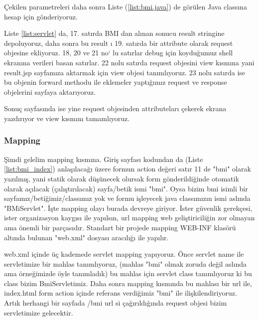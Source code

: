 
Çekilen parametreleri daha sonra Liste (\ref{list:bmi.java}) de görülen Java classına hesap için gönderiyoruz. 



Liste \ref{list:servlet} da, 17. satırda BMI dan alınan sonucu result stringine depoluyoruz, daha sonra bu result ı 19. satırda bir attribute olarak request objesine ekliyoruz. 18, 20 ve 21 no` lu satırlar debug için koyduğumuz shell ekranına verileri basan satırlar. 22 nolu satırda request objesini view kısmına yani result.jsp sayfamıza aktarmak için view objesi tanımlıyoruz. 23 nolu satırda ise bu objenin forward methodu ile eklemeler yaptığımız request ve response objelerini sayfaya aktarıyoruz.

Sonuç sayfasında ise yine request objesinden attributeları çekerek ekrana yazdırıyor ve view kısmını tamamlıyoruz.
\subsubsection{Mapping}

Şimdi gelelim mapping kısmına. Giriş sayfası  kodundan da (Liste \ref{list:bmi_index}) anlaşılacağı üzere formun action değeri satır 11 de  "bmi" olarak yazılmış, yani statik olarak düşünecek olursak form gönderildiğinde otomatik olarak açılacak (çalıştırılacak) sayfa/betik ismi "bmi". Oysa bizim bmi isimli bir sayfamız/betiğimiz/classımız yok ve formu işleyecek java classımızın ismi aslında "BMiServlet". İşte mapping olayı burada devreye giriyor. İster güvenlik gerekçesi, ister organizasyon kaygısı ile yapılsın, url mapping web geliştiriciliğin zor olmayan ama önemli bir parçasıdır. Standart bir projede mapping WEB-INF klasörü altında bulunan "web.xml" dosyası aracılığı ile yapılır. 

web.xml içinde üç kademede servlet mapping yapıyoruz. Önce servlet name ile servletimize bir mahlas tanımlıyoruz, (mahlas "bmi" olmak zoruda değil aslında ama örneğimizde öyle tanımladık) bu mahlas için servlet class tanımlıyoruz ki bu class bizim BmiServletimiz. Daha sonra mapping kısmında bu mahlası bir url ile, index.html form action içinde referans verdiğimiz "bmi" ile ilişkilendiriyoruz. Artık herhangi bir sayfada /bmi url si çağırıldığında request objesi bizim servletimize gelecektir. 
